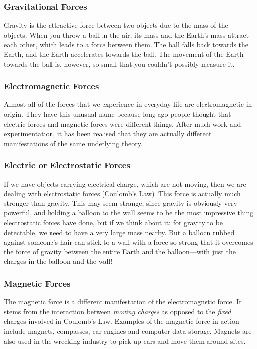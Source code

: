 \subsubsection{Gravitational Forces}
Gravity is the attractive force between two objects due to the mass of the objects. When you throw a ball in the air, its mass and the Earth's mass attract each other, which leads to a force between them. The ball falls back towards the Earth, and the Earth accelerates towards the ball. The movement of the Earth towards the ball is, however, so small that you couldn't possibly measure it.

\subsubsection{Electromagnetic Forces}
Almost all of the forces that we experience in everyday life are
electromagnetic in origin. They have this unusual name because long ago people thought that electric forces and magnetic forces were different things. After much work and experimentation, it has been realised that they are actually different manifestations of the same underlying theory.

\subsubsection{Electric or Electrostatic Forces}
If we have objects carrying electrical charge, which are not moving, then we are dealing with electrostatic forces (Coulomb's Law). This force is actually much stronger than gravity. This may seem strange, since gravity is obviously very powerful, and holding a balloon to the wall seems to be the most impressive thing electrostatic forces have done, but if we think about it: for gravity to be detectable, we need to have a very large mass nearby. But a balloon rubbed against someone's hair can stick to a wall with a force so strong that it overcomes the force of gravity between the entire Earth and the balloon---with just the charges in the balloon and the wall!

\subsubsection{Magnetic Forces}
The magnetic force is a different manifestation of the electromagnetic force. It stems from the interaction between \emph{moving charges} as opposed to the \emph{fixed} charges involved in Coulomb's Law. Examples of the magnetic force in action include magnets, compasses, car engines and computer data storage. Magnets are also used in the wrecking industry to pick up cars and move them around sites.

